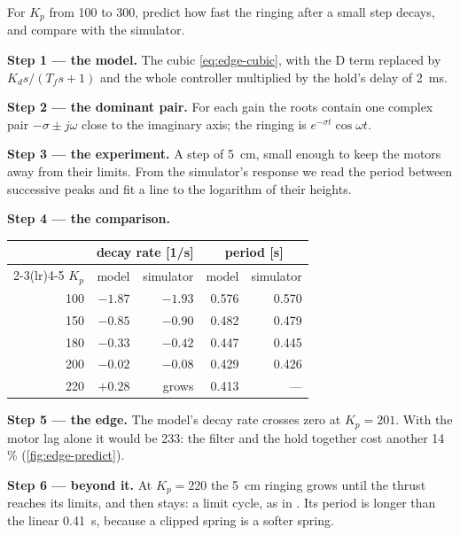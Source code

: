 \begin{example}
\label{ex:edge-ringing}
For $K_p$ from 100 to 300, predict how fast the ringing after a small step decays, and compare with the simulator.

\textbf{Step 1 — the model.} The cubic \eqref{eq:edge-cubic}, with the D term replaced by $K_ds/(T_fs + 1)$ and the whole controller multiplied by the hold's delay of \SI{2}{ms}.

\textbf{Step 2 — the dominant pair.} For each gain the roots contain one complex pair $-\sigma \pm j\omega$ close to the imaginary axis; the ringing is $e^{-\sigma t}\cos\omega t$.

\textbf{Step 3 — the experiment.} A step of \SI{5}{cm}, small enough to keep the motors away from their limits. From the simulator's response we read the period between successive peaks and fit a line to the logarithm of their heights.

\textbf{Step 4 — the comparison.}
\begin{center}\small\sffamily
\begin{tabular}{rrrrr}
\toprule
 & \multicolumn{2}{c}{decay rate [1/s]} & \multicolumn{2}{c}{period [s]}\\
\cmidrule(lr){2-3}\cmidrule(lr){4-5}
$K_p$ & model & simulator & model & simulator\\
\midrule
100 & $-1.87$ & $-1.93$ & 0.576 & 0.570\\
150 & $-0.85$ & $-0.90$ & 0.482 & 0.479\\
180 & $-0.33$ & $-0.42$ & 0.447 & 0.445\\
200 & $-0.02$ & $-0.08$ & 0.429 & 0.426\\
220 & $+0.28$ & grows & 0.413 & —\\
\bottomrule
\end{tabular}
\end{center}

\textbf{Step 5 — the edge.} The model's decay rate crosses zero at $K_p = 201$. With the motor lag alone it would be 233: the filter and the hold together cost another 14\,\% (\cref{fig:edge-predict}).

\textbf{Step 6 — beyond it.} At $K_p = 220$ the \SI{5}{cm} ringing grows until the thrust reaches its limits, and then stays: a limit cycle, as in . Its period is longer than the linear \SI{0.41}{s}, because a clipped spring is a softer spring.
\end{example}

